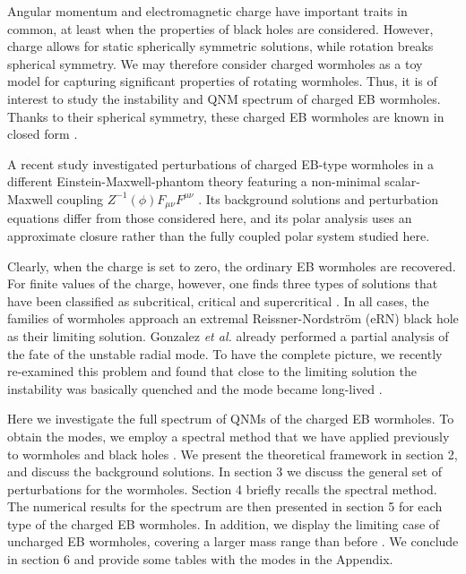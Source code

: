 \documentclass[11pt,a4paper]{article}
\begin{document}
Angular momentum and electromagnetic charge have important traits in common, at least when the properties of black holes are considered.
However, charge allows for static spherically symmetric solutions, while rotation breaks spherical symmetry.
We may therefore consider charged wormholes as a toy model for capturing significant properties of rotating wormholes.
Thus, it is of interest to study the instability and QNM spectrum of charged EB wormholes.
Thanks to their spherical symmetry, these charged EB wormholes are known in closed form \cite{Gonzalez:2009hn}.

A recent study investigated perturbations of charged EB-type wormholes in a different Einstein-Maxwell-phantom theory featuring a non-minimal scalar-Maxwell coupling $Z^{-1}(\phi)F_{\mu\nu}F^{\mu\nu}$ \cite{Wu:2025wlz}. 
Its background solutions and perturbation equations differ from those considered here, and its polar analysis uses an approximate closure rather than the fully coupled polar system studied here.

Clearly, when the charge is set to zero, the ordinary EB wormholes are recovered.
For finite values of the charge, however, one finds three types of solutions that have been classified as subcritical, critical and supercritical \cite{Gonzalez:2009hn}.
In all cases, the families of wormholes approach an extremal Reissner-Nordstr\"om (eRN) black hole as their limiting solution.
Gonzalez \textit{et al.} \cite{Gonzalez:2009hn} already performed a partial analysis of the fate of the unstable radial mode.
To have the complete picture, we recently re-examined this problem and found that close to the limiting solution the instability was basically quenched and the mode became long-lived \cite{Blazquez-Salcedo:2025dit}.

Here we investigate the full spectrum of QNMs of the charged EB wormholes.
To obtain the modes, we employ a spectral method that we have applied previously to wormholes and black holes \cite{Khoo:2024yeh,Blazquez-Salcedo:2025dit,Blazquez-Salcedo:2023hwg,Blazquez-Salcedo:2024oek,Blazquez-Salcedo:2024dur,Khoo:2024agm}.
We present the theoretical framework in section 2, and discuss the background solutions.
In section 3 we discuss the general set of perturbations for the wormholes.
Section 4 briefly recalls the spectral method.
The numerical results for the spectrum are then presented in section 5 for each type of the charged EB wormholes.
In addition, we display the limiting case of uncharged EB wormholes, covering a larger mass range than before \cite{Azad:2023iju}.
We conclude in section 6 and provide some tables with the modes in the Appendix.
\end{document}

